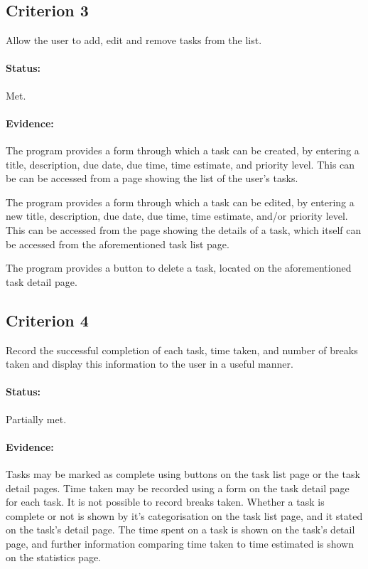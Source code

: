 \documentclass{article}
\begin{document}
\subsection*{Criterion 3}
Allow the user to add, edit and remove tasks from the list.

\paragraph{Status:}
Met.

\paragraph{Evidence:}
The program provides a form through which a task can be created,
by entering a title,
description,
due date,
due time,
time estimate,
and priority level.
This can be can be accessed from a page showing the list of the user's tasks.

The program provides a form through which a task can be edited,
by entering a new title,
description,
due date,
due time,
time estimate,
and/or priority level.
This can be accessed from the page showing the details of a task,
which itself can be accessed from the aforementioned task list page.

The program provides a button to delete a task,
located on the aforementioned task detail page.

\subsection*{Criterion 4}
Record the successful completion of each task, time taken,
and number of breaks taken and display this information to the user in a useful manner.

\paragraph{Status:}
Partially met.

\paragraph{Evidence:}
Tasks may be marked as complete using buttons on the task list page or the task detail pages.
Time taken may be recorded using a form on the task detail page for each task.
It is not possible to record breaks taken.
Whether a task is complete or not is shown by it's categorisation on the task list page,
and it stated on the task's detail page.
The time spent on a task is shown on the task's detail page,
and further information comparing time taken to time estimated is shown on the statistics page.
\end{document}
